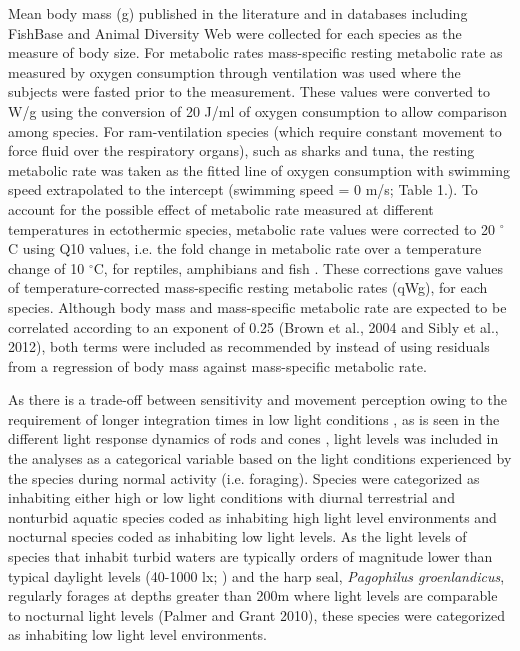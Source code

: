 Mean body mass (g) published in the literature and in databases including FishBase \citep{froese2012fishbase} and Animal Diversity Web \citep{myers2006animal} were collected for each species as the measure of body size. For metabolic rates mass-specific resting metabolic rate as measured by oxygen consumption through ventilation  was used where the subjects were fasted prior to the measurement. These values were converted to W/g using the conversion of 20 J/ml of oxygen consumption \citep{makarieva2008mean} to allow comparison among species. For ram-ventilation species (which require constant movement to force fluid over the respiratory organs), such as sharks and tuna, the resting metabolic rate was taken as the fitted line of oxygen consumption with swimming speed extrapolated to the intercept (swimming speed = 0 m/s; Table 1.). To account for the possible effect of metabolic rate measured at different temperatures in ectothermic species, metabolic rate values were corrected to 20 $^{\circ}$C using Q10 values, i.e. the fold change in metabolic rate over a temperature change of 10 $^{\circ}$C, for reptiles, amphibians and fish \citep{white2006scaling}. These corrections gave values of temperature-corrected mass-specific resting metabolic rates (qWg), for each species. Although body mass and mass-specific metabolic rate are expected to be correlated according to an exponent of 0.25 \citep{brown2004, sibly2012metabolic} (Brown et al., 2004 and Sibly et al., 2012), both terms were included as recommended by \cite{freckleton2009seven} instead of using residuals from a regression of body mass against mass-specific metabolic rate.

As there is a trade-off between sensitivity and movement perception owing to the requirement of longer integration times in low light conditions \citep{tansley1965vision}, as is seen in the different light response dynamics of rods and cones \citep{rubene2010presence}, light levels was included in the analyses as a categorical variable based on the light conditions experienced by the species during normal activity (i.e. foraging). Species were categorized as inhabiting either high or low light conditions with diurnal terrestrial and nonturbid aquatic species coded as inhabiting high light level environments and nocturnal species coded as inhabiting low light levels. As the light levels of species that inhabit turbid waters are typically orders of magnitude lower than typical daylight levels (40-1000 lx; \citealt{ali1985vision,palmer2010art,kreysing2012photonic}) and the harp seal, \textit{Pagophilus groenlandicus}, regularly forages at depths greater than 200m \citep{folkow2004distribution} where light levels are comparable to nocturnal light levels (Palmer and Grant 2010), these species were categorized as inhabiting low light level environments.


